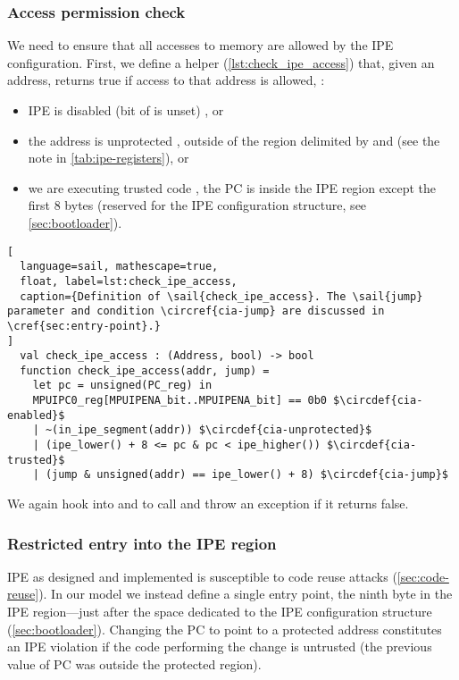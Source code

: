 \subsubsection{Access permission check}

We need to ensure that all accesses to memory are allowed by the IPE configuration. First, we define a helper  (\cref{lst:check_ipe_access}) that, given an address, returns true if access to that address is allowed, \ie:
\begin{itemize}
\item IPE is disabled (bit  of  is unset) , or
\item the address is unprotected , \ie outside of the region delimited by  and  (see the note in \cref{tab:ipe-registers}), or
\item we are executing trusted code , \ie the PC is inside the IPE region except the first 8 bytes (reserved for the IPE configuration structure, see \cref{sec:bootloader}).
\end{itemize}

\startcstep
\begin{lstlisting}[
  language=sail, mathescape=true,
  float, label=lst:check_ipe_access,
  caption={Definition of \sail{check_ipe_access}. The \sail{jump} parameter and condition \circref{cia-jump} are discussed in \cref{sec:entry-point}.}
]
  val check_ipe_access : (Address, bool) -> bool
  function check_ipe_access(addr, jump) =
    let pc = unsigned(PC_reg) in
    MPUIPC0_reg[MPUIPENA_bit..MPUIPENA_bit] == 0b0 $\circdef{cia-enabled}$
    | ~(in_ipe_segment(addr)) $\circdef{cia-unprotected}$
    | (ipe_lower() + 8 <= pc & pc < ipe_higher()) $\circdef{cia-trusted}$
    | (jump & unsigned(addr) == ipe_lower() + 8) $\circdef{cia-jump}$
\end{lstlisting}

We again hook into  and  to call  and throw an  exception if it returns false.

\subsubsection{Restricted entry into the IPE region}
\label{sec:entry-point}

IPE as designed and implemented is susceptible to code reuse attacks (\cref{sec:code-reuse}). In our model we instead define a single entry point, the ninth byte in the IPE region---just after the space dedicated to the IPE configuration structure (\cref{sec:bootloader}). Changing the PC to point to a protected address constitutes an IPE violation if the code performing the change is untrusted (\ie the previous value of PC was outside the protected region).


